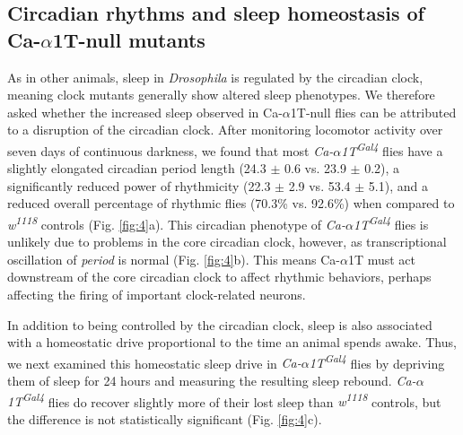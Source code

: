 \subsection*{Circadian rhythms and sleep homeostasis of Ca-$\alpha$1T-null mutants}

As in other animals, sleep in \emph{Drosophila} is regulated by the circadian clock, meaning clock mutants generally show altered sleep phenotypes\cite{hendricks:2003aa, parisky:2008aa}.
We therefore asked whether the increased sleep observed in Ca-$\alpha$1T-null flies can be attributed to a disruption of the circadian clock.
After monitoring locomotor activity over seven days of continuous darkness, we found that most \emph{Ca-$\alpha$1T\textsuperscript{Gal4}} flies have a slightly elongated circadian period length (24.3 $\pm$ 0.6 vs. 23.9 $\pm$ 0.2), a significantly reduced power of rhythmicity (22.3 $\pm$ 2.9 vs. 53.4 $\pm$ 5.1), and a reduced overall percentage of rhythmic flies (70.3\% vs. 92.6\%) when compared to \emph{w\textsuperscript{1118}} controls (Fig. \ref{fig:4}a).
This circadian phenotype of \emph{Ca-$\alpha$1T\textsuperscript{Gal4}} flies is unlikely due to problems in the core circadian clock, however, as transcriptional oscillation of \emph{period} is normal (Fig. \ref{fig:4}b).
This means Ca-$\alpha$1T must act downstream of the core circadian clock to affect rhythmic behaviors, perhaps affecting the firing of important clock-related neurons.

In addition to being controlled by the circadian clock, sleep is also associated with a homeostatic drive proportional to the time an animal spends awake. Thus, we next examined this homeostatic sleep drive in \emph{Ca-$\alpha$1T\textsuperscript{Gal4}} flies by depriving them of sleep for 24 hours and measuring the resulting sleep rebound. \emph{Ca-$\alpha$1T\textsuperscript{Gal4}} flies do recover slightly more of their lost sleep than \emph{w\textsuperscript{1118}} controls, but the difference is not statistically significant (Fig. \ref{fig:4}c).

